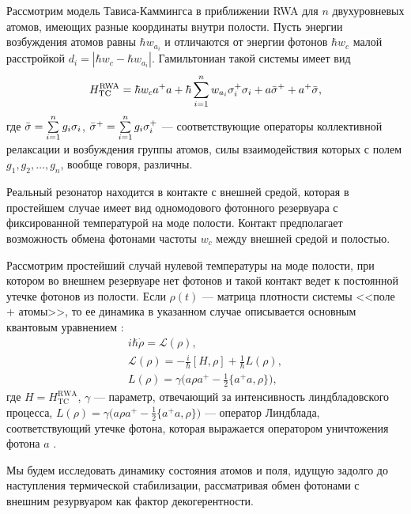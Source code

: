 Рассмотрим модель Тависа-Каммингса в приближении RWA \cite{ozhigov_qq, rwa_1, rwa_2} для $n$ двухуровневых атомов, имеющих разные координаты внутри полости. Пусть энергии возбуждения атомов равны $\hbar w_{a_{i}}$ и отличаются от энергии фотонов $\hbar w_{c}$ малой расстройкой $d_i=|\hbar w_{c}-\hbar w_{a_{i}}|$. Гамильтониан такой системы имеет вид
\begin{equation}
	\label{TC}
	H_{\text{TC}}^{\text{RWA}}=\hbar w_{c} a^+a+\hbar \sum\limits_{i=1}^{n}w_{a_{i}}\sigma^{+}_i\sigma_i+a\bar{\sigma}^{+}+a^{+}\bar{\sigma},
\end{equation}
где $\bar{\sigma}=\sum\limits_{i=1}^{n}g_{i}\sigma_{i}$, $\bar{\sigma}^{+}=\sum\limits_{i=1}^ng_{i}\sigma^{+}_{i}$ --- соответствующие операторы коллективной релаксации и возбуждения группы атомов, силы взаимодействия которых с полем $g_{1},g_{2},\dots,g_{n}$, вообще говоря, различны. 

Реальный резонатор находится в контакте с внешней средой, которая в простейшем случае имеет вид одномодового фотонного резервуара с фиксированной температурой на моде полости. Контакт предполагает возможность обмена фотонами частоты $w_{c}$ между внешней средой и полостью. 

Рассмотрим простейший случай нулевой температуры на моде полости, при котором во внешнем резервуаре нет фотонов и такой контакт ведет к постоянной утечке фотонов из полости. Если $\rho(t)$ --- матрица плотности системы <<поле + атомы>>, то ее динамика в указанном случае описывается основным квантовым уравнением \cite{breuer}:
\begin{equation}\label{lindblad}
	\begin{gathered}
		i\hbar\dot{\rho}={\mathcal{L}}(\rho),\\
		{\mathcal{L}}(\rho)=-\frac{i}{\hbar}[H,\rho]+\frac{1}{\hbar}L(\rho),\\
		L(\rho)=\gamma\biggl(a\rho a^+-\frac{1}{2}\{a^+a,\rho\}\biggr),
	\end{gathered}
\end{equation}
где  $H=H_{\text{TC}}^{\text{RWA}}$, $\gamma$ --- параметр, отвечающий за интенсивность линдбладовского процесса, $L(\rho)=\gamma\bigl(a\rho a^{+}-\frac{1}{2}\{a^{+}a,\rho\}\bigr)$ --- оператор Линдблада, соответствующий утечке фотона, которая выражается оператором уничтожения фотона $a$ \cite{breuer,photon_emission}. 

Мы будем исследовать динамику состояния атомов и поля, идущую задолго до наступления термической стабилизации, рассматривая обмен фотонами с внешним резурвуаром как фактор декогерентности.

